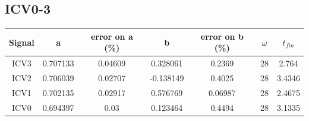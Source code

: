 \documentclass{report}
\begin{document}
\subsection{ICV0-3}
\begin{tabular}{||c c c c c c c||}
 \hline
 Signal & a & error on a (\%) & b & error on b (\%) & $\omega$ & $t_{fin}$\\ [0.5ex]
 \hline\hline
 ICV3 & 0.707133&  0.04609 & 0.328061 & 0.2369 & 28 & 2.764\\
 ICV2& 0.706039&  0.02707 & -0.138149 & 0.4025 & 28 & 3.4346\\
 ICV1& 0.702135&  0.02917 & 0.576769 & 0.06987 & 28 & 2.4675\\
 ICV0& 0.694397&  0.03 & 0.123464 & 0.4494 & 28 & 3.1335\\
 \hline
\end{tabular}
\end{document}
